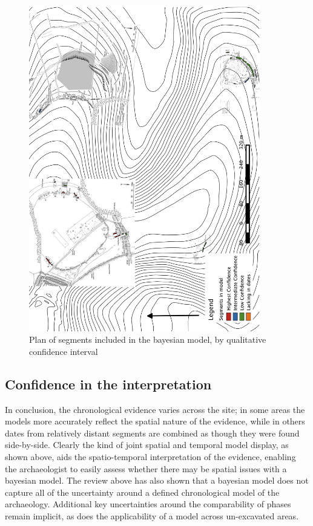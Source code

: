 \begin{figure}
\begin{center}
	\includegraphics[width=0.9\textwidth]{figures/dated-confidence}
\end{center}
  \caption{Plan of segments included in the bayesian model, by qualitative confidence interval}
  \label{fig:dated-confidence}
\end{figure}

\subsection{Confidence in the interpretation}
In conclusion, the chronological evidence varies across the site; in some areas the models more accurately reflect the spatial nature of the evidence, while in others dates from relatively distant segments are combined as though they were found side-by-side. Clearly the kind of joint spatial and temporal model display, as shown above, aids the spatio-temporal interpretation of the evidence, enabling the archaeologist to easily assess whether there may be spatial issues with a bayesian model. The review above has also shown that a bayesian model does not capture all of the uncertainty around a defined chronological model of the archaeology. Additional key uncertainties around the comparability of phases remain implicit, as does the applicability of a model across un-excavated areas. 

